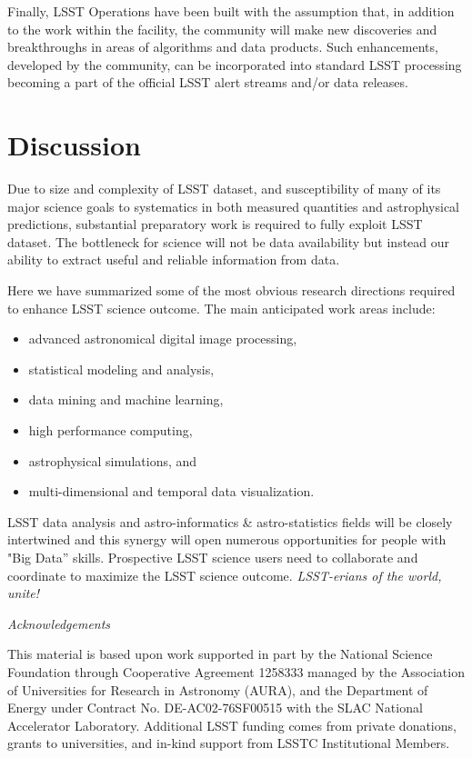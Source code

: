 \documentclass{iau}
\begin{document}
Finally, LSST Operations have been built with the assumption that, in
addition to the work within the facility, the community will make new
discoveries and breakthroughs in areas of algorithms and data products.
Such enhancements, developed by the community, can be incorporated into
standard LSST processing becoming a part of the official LSST alert
streams and/or data releases.

\section{Discussion}

Due to size and complexity of LSST dataset, and susceptibility of many
of its major science goals to systematics in both measured quantities
and astrophysical predictions, substantial preparatory work is
required to fully exploit LSST dataset. The bottleneck for science
will not be data availability but instead our ability to extract
useful and reliable information from data.

Here we have summarized some of the most obvious research directions
required to enhance LSST science outcome. The main anticipated work
areas include:
\begin{itemize}
\item advanced astronomical digital image processing,
\item statistical modeling and analysis,
\item data mining and machine learning,
\item high performance computing,
\item astrophysical simulations, and
\item multi-dimensional and temporal data visualization.  
\end{itemize}

LSST data analysis and astro-informatics \& astro-statistics fields will be closely intertwined and this synergy
will open numerous opportunities for people with "Big Data” skills. Prospective LSST science users need to
 collaborate and coordinate to maximize the LSST science outcome.  {\it LSST-erians of the world, unite!}  


\vskip 0.2in 
{\it Acknowledgements}  

This material is based upon work supported in part by the National Science Foundation through
Cooperative Agreement 1258333 managed by the Association of Universities for Research in Astronomy
(AURA), and the Department of Energy under Contract No. DE-AC02-76SF00515 with the SLAC National
Accelerator Laboratory. Additional LSST funding comes from private donations, grants to universities,
and in-kind support from LSSTC Institutional Members.
\end{document}
